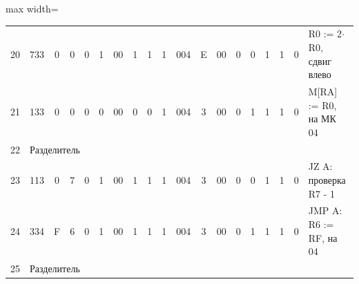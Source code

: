 \documentclass[11pt, a4paper]{article}
\begin{document}
{\begin{table}[h!]
\begin{adjustbox}{max width=\textwidth}
\begin{tabular}{|c|c|c|c|c|c|c|c|c|c|c|c|c|c|c|c|c|c|l|}
				20          & 733                               & 0                                 & 0                                      & 0                                      & 1             & 00          & 1                                       & 1                                     & 1                    & 004            & E             & 00         & 0          & 0            & 1           & 1            & 0           & R0 := 2$\cdot$R0, сдвиг влево  \\
				21          & 133                               & 0                                 & 0                                      & 0                                      & 0             & 00          & 0                                       & 0                                     & 1                    & 004            & 3             & 00         & 0          & 1            & 1           & 1            & 0           & M[RA] := R0, на МК 04          \\
				22          & \multicolumn{18}{l|}{Разделитель}                                                                                                                                                                                                                                                                                                                                                                                                                    \\
				23          & 113                               & 0                                 & 7                                      & 0                                      & 1             & 00          & 1                                       & 1                                     & 1                    & 004            & 3             & 00         & 0          & 0            & 1           & 1            & 0           & JZ A: проверка R7 - 1          \\
				24          & 334                               & F                                 & 6                                      & 0                                      & 1             & 00          & 1                                       & 1                                     & 1                    & 004            & 3             & 00         & 0          & 1            & 1           & 1            & 0           & JMP A: R6 := RF, на 04         \\
				25          & \multicolumn{18}{l|}{Разделитель}                                                                                                                                                                                                                                                                                                                                                                                                                    \\

\end{tabular}
\end{adjustbox}
\end{table}}
\end{document}
